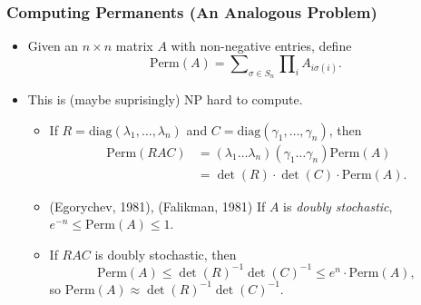 \documentclass[usenames,dvipsnames,12pt]{beamer}
\begin{document}






\begin{frame}
    \frametitle{Computing Permanents (An Analogous Problem)}

    \begin{itemize}
        \item Given an $n \times n$ matrix $A$ with non-negative entries, define
        \[ \text{Perm}(A) = \sum\nolimits_{\sigma \in S_n} \prod\nolimits_i A_{i \sigma(i)}. \]
        
        \pause
        \item This is (maybe suprisingly) NP hard to compute.

        \begin{itemize}
            \pause
            \item If $R = \text{diag}(\lambda_1, \dots, \lambda_n)$ and $C = \text{diag}(\gamma_1,\dots,\gamma_n)$, then
            \begin{align*}
                \text{Perm}(R A C) &= (\lambda_1 \dots \lambda_n)(\gamma_1 \dots \gamma_n) \text{Perm}(A)\\
                &= \det(R) \cdot \det(C) \cdot \text{Perm}(A).
            \end{align*}

            \pause
            \item (Egorychev, 1981), (Falikman, 1981) If $A$ is \emph{doubly stochastic}, $e^{-n} \leq \text{Perm}(A) \leq 1$.

            \pause
            \item If $RAC$ is doubly stochastic, then
            \[ \text{Perm}(A) \leq \det(R)^{-1} \det(C)^{-1} \leq e^n \cdot \text{Perm}(A), \]
            so $\text{Perm}(A) \approx \det(R)^{-1} \det(C)^{-1}$.
        \end{itemize}
    \end{itemize}
\end{frame}
\end{document}

